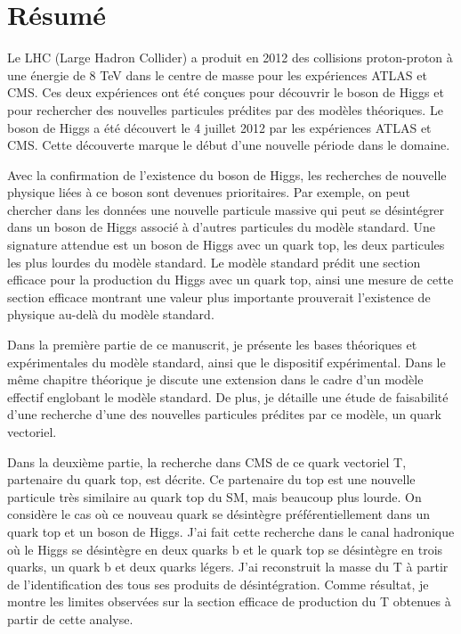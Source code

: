 \chapter*{R\'{e}sum\'{e}}

Le LHC (Large Hadron Collider) a produit en 2012 des collisions proton-proton à une énergie de 8 TeV  dans le centre de masse pour les expériences ATLAS et CMS. Ces deux expériences ont été conçues pour découvrir le boson de Higgs et pour rechercher des nouvelles particules prédites par des modèles théoriques. Le boson de Higgs a été découvert le 4 juillet 2012 par les expériences ATLAS et CMS. Cette découverte marque le début  d'une nouvelle période dans le domaine. 

Avec la confirmation de l'existence du boson de Higgs, les recherches de nouvelle physique liées à ce boson sont devenues prioritaires. Par exemple, on peut chercher dans les données une nouvelle particule massive qui peut se désintégrer dans un boson de Higgs associé à d'autres particules du modèle standard. Une signature attendue est un boson de Higgs avec un quark top, les deux particules les plus lourdes du modèle standard. Le modèle standard prédit une section efficace pour la production du Higgs avec un quark top, ainsi une mesure de cette section efficace montrant une valeur plus importante prouverait l'existence de physique au-delà du modèle standard.

Dans la première partie de ce manuscrit, je présente les bases théoriques et expérimentales du modèle standard, ainsi que le dispositif expérimental. Dans le même chapitre théorique je discute une extension dans le cadre d'un modèle effectif englobant le modèle standard. De plus, je détaille une étude de faisabilité d'une recherche d'une des nouvelles particules prédites par ce modèle, un quark vectoriel.

Dans la deuxième partie, la recherche dans CMS de ce quark vectoriel T,  partenaire du quark top, est décrite. Ce partenaire du top est une nouvelle particule très similaire au quark top du SM, mais beaucoup plus lourde. On considère le cas où ce nouveau quark se désintègre préférentiellement dans un quark top et un boson de Higgs. J'ai fait cette recherche dans le canal hadronique où le Higgs se désintègre en deux quarks b et le quark top se désintègre en trois quarks, un quark b et deux quarks légers. J'ai reconstruit la masse du T à partir de l'identification des tous ses produits de désintégration. Comme résultat, je montre les limites observées sur la section efficace de production du T obtenues à partir de cette analyse.
  

\endgroup